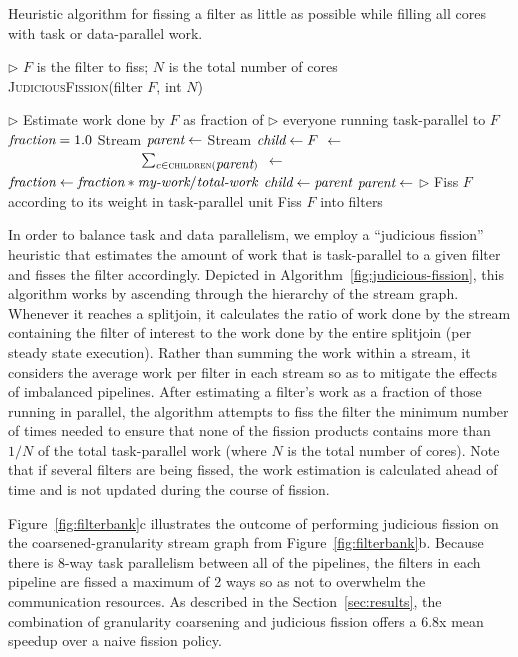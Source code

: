 \begin{algorithm}[t]
\caption{Heuristic algorithm for fissing a filter as little as
possible while filling all cores with task or data-parallel
work. \label{fig:judicious-fission}}
{$\triangleright$ $F$ is the filter to fiss; $N$ is the total number of cores\\
\textsc{JudiciousFission}(filter $F$, int $N$)}
\begin{algorithmic}
\Statex $\triangleright$ Estimate work done by $F$ as fraction of
\Statex $\triangleright$ everyone running task-parallel to $F$
\State $\mbox{\it fraction} = 1.0$
\State Stream $\mbox{\it parent} \gets$ 
\State Stream $\mbox{\it child}  \gets F$
		\State {} $\gets$ \\
\ \ \ \ \ \ \ \ \ \ \ \ \ \  \ \ \ \ \  $\sum_{c \in \textsc{children}(\mbox{\it parent})}$ 
		\State {} $ \gets $ 
		\State $\mbox{\it fraction} \gets \mbox{\it fraction} * \mbox{\it my-work} /
\mbox{\it total-work}$
	\EndIf
	\State $\mbox{\it child} \gets \mbox{\it parent}$
	\State $\mbox{\it parent} \gets $ 
\EndWhile
\Statex $\triangleright$ Fiss $F$ according to its weight in task-parallel unit
\State Fiss $F$ into  filters
\end{algorithmic}
\end{algorithm}

In order to balance task and data parallelism, we employ a ``judicious
fission'' heuristic that estimates the amount of work that is
task-parallel to a given filter and fisses the filter accordingly.
Depicted in Algorithm~\ref{fig:judicious-fission}, this algorithm
works by ascending through the hierarchy of the stream graph.
Whenever it reaches a splitjoin, it calculates the ratio of work done
by the stream containing the filter of interest to the work done by
the entire splitjoin (per steady state execution).  Rather than
summing the work within a stream, it considers the average work per
filter in each stream so as to mitigate the effects of imbalanced
pipelines.
After estimating a filter's work as a fraction of those running in
parallel, the algorithm attempts to fiss the filter the minimum number
of times needed to ensure that none of the fission products contains
more than $1/N$ of the total task-parallel work (where $N$ is the
total number of cores).  Note that if several filters are being
fissed, the work estimation is calculated ahead of time and is not
updated during the course of fission.

Figure~\ref{fig:filterbank}c illustrates the outcome of performing
judicious fission on the coarsened-granularity stream graph from
Figure~\ref{fig:filterbank}b.  Because there is 8-way task parallelism
between all of the pipelines, the filters in each pipeline are fissed
a maximum of 2 ways so as not to overwhelm the communication
resources.  As described in the Section~\ref{sec:results}, the
combination of granularity coarsening and judicious fission offers a
6.8x mean speedup over a naive fission policy.
